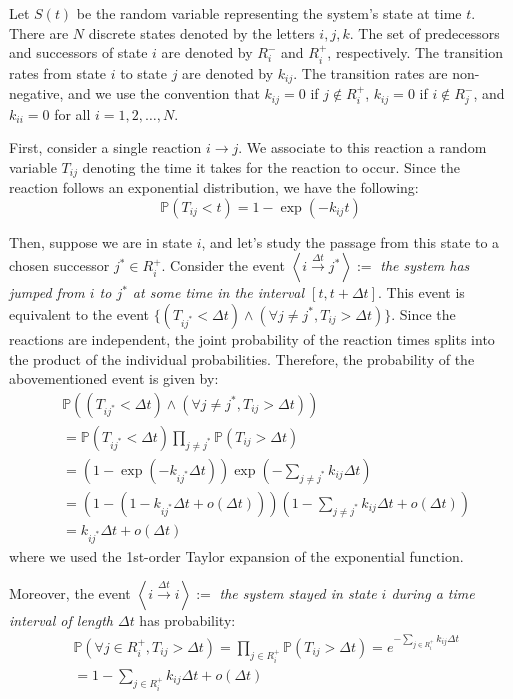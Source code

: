 \documentclass{article}
\theoremstyle{remark}
\begin{document}
    Let $S(t)$ be the random variable representing the system's state at time $t$. There are $N$ discrete states denoted by the letters $i,j,k$. The set of predecessors and successors of state $i$ are denoted by $R_i^-$ and $R_i^+$, respectively. The transition rates from state $i$ to state $j$ are denoted by $k_{ij}$. The transition rates are non-negative, and we use the convention that $k_{ij}=0$ if $j\notin R_i^+$, $k_{ij}=0$ if $i\notin R_j^-$, and $k_{ii}=0$ for all $i=1,2,\dots,N$.
    
    First, consider a single reaction $i\to j$. We associate to this reaction a random variable $T_{ij}$ denoting the time it takes for the reaction to occur. Since the reaction follows an exponential distribution, we have the following:
    \begin{equation}    
        \mathbb{P}(T_{ij}<t) = 1-\exp(-k_{ij}t)
    \end{equation}
    
    Then, suppose we are in state $i$, and let's study the passage from this state to a chosen successor $j^*\in R_i^+$. Consider the event $\left<i\xrightarrow{\Delta t}j^*\right> :=$ \textit{the system has jumped from $i$ to $j^*$ at some time in the interval $[t,t+\Delta t]$}. This event is equivalent to the event $\{(T_{ij^*}<\Delta t) \wedge (\forall j\neq j^*, T_{ij}>\Delta t)\}$. Since the reactions are independent, the joint probability of the reaction times splits into the product of the individual probabilities. Therefore, the probability of the abovementioned event is given by:
    \begin{equation}
    \begin{split}
        &\mathbb{P}\left((T_{ij^*}<\Delta t) \wedge (\forall j\neq j^*, T_{ij}>\Delta t)\right) \\
        &= \mathbb{P}(T_{ij^*}<\Delta t)\prod_{j\neq j^*}\mathbb{P}(T_{ij}>\Delta t) \\
        &= (1-\exp(-k_{ij^*}\Delta t))\exp(-\sum_{j\neq j^*}k_{ij}\Delta t) \\
        &= (1 - (1 - k_{ij^*}\Delta t + o(\Delta t)))(1 - \sum_{j\neq j^*}k_{ij}\Delta t + o(\Delta t)) \\
        &= k_{ij^*}\Delta t + o(\Delta t)
    \end{split}
    \end{equation}
    where we used the 1st-order Taylor expansion of the exponential function. 
    
    Moreover, the event $\left<i\xrightarrow{\Delta t}i\right>:=$ \textit{the system stayed in state $i$ during a time interval of length $\Delta t$} has probability:
    \begin{equation}
    \begin{split}
        &\mathbb{P}(\forall j\in R_i^+, T_{ij}>\Delta t) 
        = \prod_{j\in R_i^+}\mathbb{P}(T_{ij}>\Delta t) 
        = e^{-\sum_{j\in R_i^+}k_{ij}\Delta t} \\
        &= 1 - \sum_{j\in R_i^+}k_{ij}\Delta t + o(\Delta t)
    \end{split}
    \end{equation}
    
\end{document}
